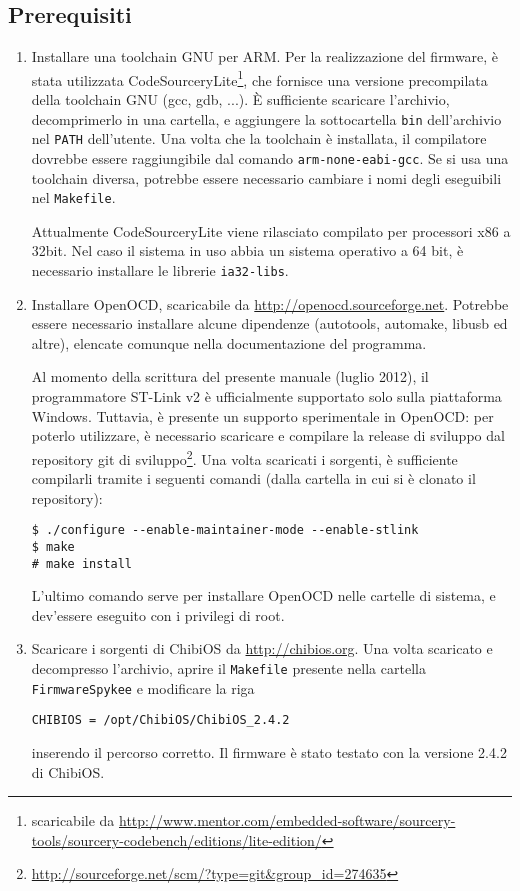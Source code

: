 \subsection*{Prerequisiti}
\begin{enumerate}
\item Installare una toolchain GNU per ARM. Per la realizzazione del firmware, è stata utilizzata  CodeSourceryLite\footnote{scaricabile da \url{http://www.mentor.com/embedded-software/sourcery-tools/sourcery-codebench/editions/lite-edition/}}, che fornisce una versione precompilata della toolchain GNU (gcc, gdb, ...). È sufficiente scaricare l'archivio, decomprimerlo in una cartella, e aggiungere la sottocartella \verb|bin| dell'archivio nel \verb|PATH| dell’utente. Una volta che la toolchain è installata, il compilatore dovrebbe essere raggiungibile dal comando \verb|arm-none-eabi-gcc|. Se si usa una toolchain diversa, potrebbe essere necessario cambiare i nomi degli eseguibili nel \verb|Makefile|.

\begin{nota}
Attualmente CodeSourceryLite viene rilasciato compilato per processori x86 a 32bit. Nel caso il sistema in uso abbia un sistema operativo a 64 bit, è necessario installare le librerie \verb|ia32-libs|.
\end{nota}

\item Installare OpenOCD, scaricabile da \url{http://openocd.sourceforge.net}. Potrebbe essere necessario installare alcune dipendenze (autotools, automake, libusb ed altre), elencate comunque nella documentazione del programma.

\begin{nota}
Al momento della scrittura del presente manuale (luglio 2012), il programmatore ST-Link v2 è ufficialmente supportato solo sulla piattaforma Windows. Tuttavia, è presente un supporto sperimentale in OpenOCD: per poterlo utilizzare, è necessario scaricare e compilare la release di sviluppo dal repository git di sviluppo\footnote{\url{http://sourceforge.net/scm/?type=git&group_id=274635}}. Una volta scaricati i sorgenti, è sufficiente compilarli tramite i seguenti comandi  (dalla cartella in cui si è clonato il repository):
\begin{verbatim}
$ ./configure --enable-maintainer-mode --enable-stlink
$ make
# make install
\end{verbatim}
L'ultimo comando serve per installare OpenOCD nelle cartelle di sistema, e dev'essere eseguito con i privilegi di root.
\end{nota}

\item Scaricare i sorgenti di ChibiOS da \url{http://chibios.org}. Una volta scaricato e decompresso l'archivio, aprire il \verb|Makefile| presente nella cartella \verb|FirmwareSpykee| e modificare la riga
\begin{verbatim}
CHIBIOS = /opt/ChibiOS/ChibiOS_2.4.2
\end{verbatim}
inserendo il percorso corretto. Il firmware è stato testato con la versione 2.4.2 di ChibiOS.
\end{enumerate}

